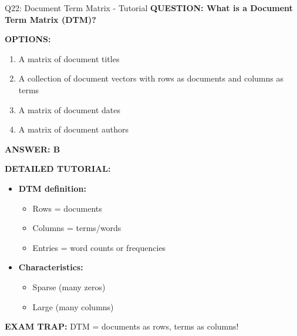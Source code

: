 \documentclass[8pt]{beamer}
\begin{document}
	\begin{frame}{Q22: Document Term Matrix - Tutorial}
		\fontsize{6.5}{7.5}\selectfont
		\textbf{QUESTION: What is a Document Term Matrix (DTM)?}
		
		\vspace{0.1cm}
		\textbf{OPTIONS:}
		\begin{enumerate}
			\item A matrix of document titles
			\item A collection of document vectors with rows as documents and columns as terms
			\item A matrix of document dates
			\item A matrix of document authors
		\end{enumerate}
		
		\vspace{0.1cm}
		\textcolor{myblue}{\textbf{ANSWER: B}}
		
		\vspace{0.1cm}
		\textbf{DETAILED TUTORIAL:}
		\begin{itemize}
			\item \textbf{DTM definition:}
			\begin{itemize}
				\item Rows = documents
				\item Columns = terms/words
				\item Entries = word counts or frequencies
			\end{itemize}
			\item \textbf{Characteristics:}
			\begin{itemize}
				\item Sparse (many zeros)
				\item Large (many columns)
			\end{itemize}
		\end{itemize}
		
		\textcolor{myred}{\textbf{EXAM TRAP:}} DTM = \textcolor{myblue}{documents as rows, terms as columns}!
	\end{frame}
	
\end{document}
